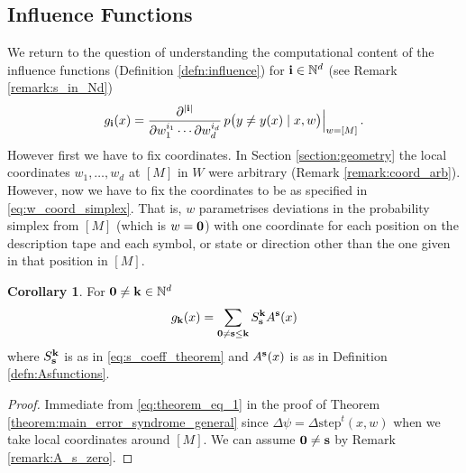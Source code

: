 \documentclass[english,letter paper,12pt,reqno]{article}
\theoremstyle{definition}
\newtheorem{corollary}[theorem]{Corollary}
\def\be{\begin{equation}}
\def\ee{\end{equation}}
\begin{document}
\subsection{Influence Functions}\label{section:influence_func_utm}

We return to the question of understanding the computational content of the influence functions (Definition \ref{defn:influence}) for $\bold{i} \in \mathbb{N}^d$ (see Remark \ref{remark:s_in_Nd})
\begin{equation}
g_{\bold{i}}(x) = \frac{\partial^{|\bold{i}|}}{\partial w_1^{i_1} \cdots \partial w_d^{i_d}}\, p\big( y \neq y(x) \mid x, w \big) \Bigr|_{w = [M]}\,.
\end{equation}
However first we have to fix coordinates. In Section \ref{section:geometry} the local coordinates $w_1,\ldots,w_d$ at $[M]$ in $W$ were arbitrary (Remark \ref{remark:coord_arb}). However, now we have to fix the coordinates to be as specified in \eqref{eq:w_coord_simplex}. That is, $w$ parametrises deviations in the probability simplex from $[M]$ (which is $w = \bold{0}$) with one coordinate for each position on the description tape and each symbol, or state or direction other than the one given in that position in $[M]$.


\begin{corollary} For $\bold{0} \neq \bold{k} \in \mathbb{N}^d$
\be
g_{\bold{k}}(x) = \sum_{\bold{0} \neq \bold{s} \le \bold{k}} S^{\bold{k}}_{\bold{s}} A^{\bold{s}}(x)
\ee
where $S^{\bold{k}}_{\bold{s}}$ is as in \eqref{eq:s_coeff_theorem} and $A^{\bold{s}}(x)$ is as in Definition \ref{defn:Asfunctions}.
\end{corollary}
\begin{proof}
Immediate from \eqref{eq:theorem_eq_1} in the proof of Theorem \ref{theorem:main_error_syndrome_general} since $\Delta \psi = \Delta\textrm{step}^t(x,w)$ when we take local coordinates around $[M]$. We can assume $\bold{0} \neq \bold{s}$ by Remark \ref{remark:A_s_zero}.
\end{proof}
\end{document}
